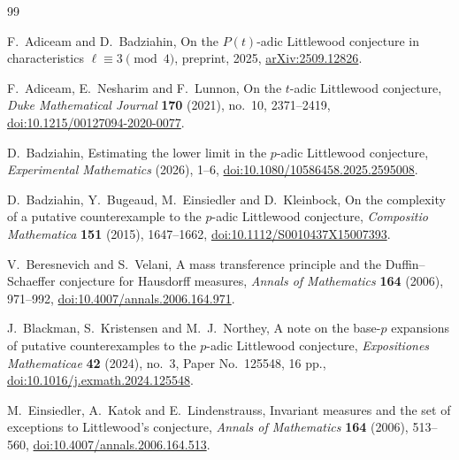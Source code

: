 \documentclass[11pt]{article}
\theoremstyle{remark}
\begin{document}
\begin{thebibliography}{99}

F.~Adiceam and D.~Badziahin,
\newblock On the $P(t)$-adic Littlewood conjecture in characteristics
$\ell\equiv3\pmod4$,
\newblock preprint, 2025,
\newblock \href{https://arxiv.org/abs/2509.12826}{arXiv:2509.12826}.

F.~Adiceam, E.~Nesharim and F.~Lunnon,
\newblock On the $t$-adic Littlewood conjecture,
\newblock \emph{Duke Mathematical Journal} \textbf{170} (2021), no.~10,
2371--2419,
\newblock \href{https://doi.org/10.1215/00127094-2020-0077}
{doi:10.1215/00127094-2020-0077}.

D.~Badziahin,
\newblock Estimating the lower limit in the $p$-adic Littlewood conjecture,
\newblock \emph{Experimental Mathematics} (2026), 1--6,
\newblock \href{https://doi.org/10.1080/10586458.2025.2595008}
{doi:10.1080/10586458.2025.2595008}.

D.~Badziahin, Y.~Bugeaud, M.~Einsiedler and D.~Kleinbock,
\newblock On the complexity of a putative counterexample to the $p$-adic
Littlewood conjecture,
\newblock \emph{Compositio Mathematica} \textbf{151} (2015), 1647--1662,
\newblock \href{https://doi.org/10.1112/S0010437X15007393}
{doi:10.1112/S0010437X15007393}.

V.~Beresnevich and S.~Velani,
\newblock A mass transference principle and the Duffin--Schaeffer conjecture
for Hausdorff measures,
\newblock \emph{Annals of Mathematics} \textbf{164} (2006), 971--992,
\newblock \href{https://doi.org/10.4007/annals.2006.164.971}
{doi:10.4007/annals.2006.164.971}.

J.~Blackman, S.~Kristensen and M.~J.~Northey,
\newblock A note on the base-$p$ expansions of putative counterexamples to
the $p$-adic Littlewood conjecture,
\newblock \emph{Expositiones Mathematicae} \textbf{42} (2024), no.~3,
Paper No.~125548, 16 pp.,
\newblock \href{https://doi.org/10.1016/j.exmath.2024.125548}
{doi:10.1016/j.exmath.2024.125548}.

M.~Einsiedler, A.~Katok and E.~Lindenstrauss,
\newblock Invariant measures and the set of exceptions to Littlewood's
conjecture,
\newblock \emph{Annals of Mathematics} \textbf{164} (2006), 513--560,
\newblock \href{https://doi.org/10.4007/annals.2006.164.513}
{doi:10.4007/annals.2006.164.513}.


\end{thebibliography}
\end{document}
